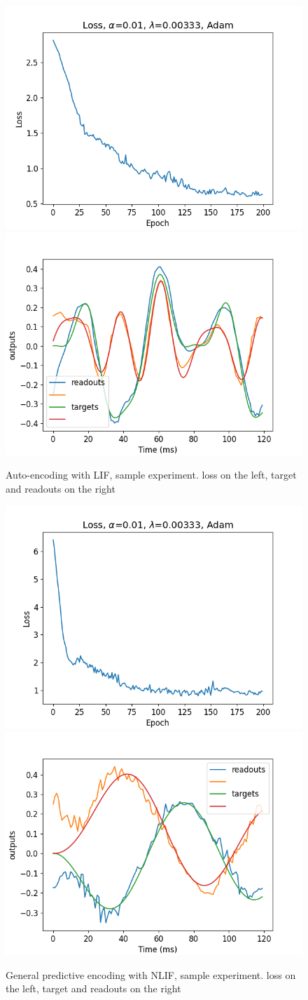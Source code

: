 \documentclass[mphil,deptreport,ianc]{infthesis} %
\begin{document}
\begin{figure}
    \centering
    \includegraphics[width=0.49\columnwidth]{figures/Gating/AutoEncoding/LIF_sample/plot_loss_test_mt_LIF_et_AutoEncoding_N_30_titers_200.png}
    \includegraphics[width=0.49\columnwidth]{figures/Gating/AutoEncoding/LIF_sample/test_plot_outputs_LIF_seed_25.png}
    \caption{Auto-encoding with LIF, sample experiment. loss on the left, target and readouts on the right}
    \label{fig:autoencoding_LIF}
\end{figure}


\begin{figure}
    \centering
    \includegraphics[width=0.49\columnwidth]{figures/Gating/GeneralPredictiveEncoding/NLIF_sample/plot_loss_test_mt_NLIF_et_GeneralPredictiveEncoding_N_30_titers_200.png}
    \includegraphics[width=0.49\columnwidth]{figures/Gating/GeneralPredictiveEncoding/NLIF_sample/test_plot_outputs_NLIF_seed_25.png}
    \caption{General predictive encoding with NLIF, sample experiment. loss on the left, target and readouts on the right}
    \label{fig:general_predictive_NLIF}
\end{figure}
\end{document}
